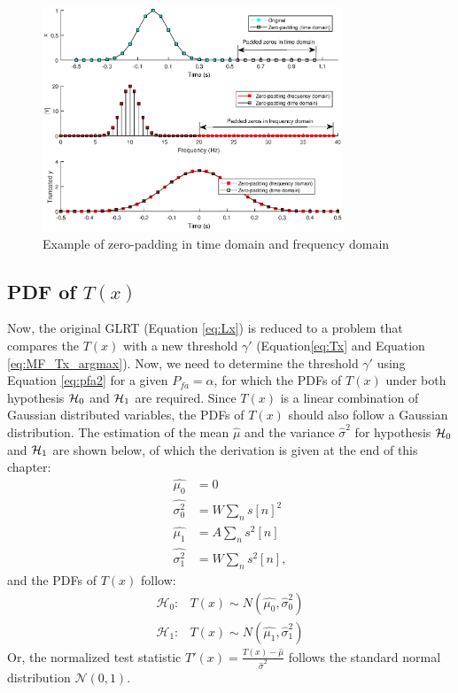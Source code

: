 \begin{figure}[t!p]
\centering
\includegraphics[width=0.8\textwidth]{figures/chapter_ADC_MF/signal_pad_nopad.eps}
\caption{Example of zero-padding in time domain and frequency domain}
\label{fig:ADC_NP_zeropad}
\end{figure}
\subsection{PDF of $T(x)$}
Now, the original GLRT (Equation \eqref{eq:Lx}) is reduced to a problem that compares the $T(x)$ with a new threshold $\gamma'$ (Equation\eqref{eq:Tx} and Equation \eqref{eq:MF_Tx_argmax}). Now, we need to determine the threshold $\gamma'$ using Equation \eqref{eq:pfa2} for a given $P_{fa} = \alpha$, for which the PDFs of $T(x)$ under both hypothesis $\operatorname*{\mathcal{H}_0}$ and $\operatorname*{\mathcal{H}_1}$ are required. Since $T(x)$ is a linear combination of Gaussian distributed variables, the PDFs of $T(x)$ should also follow a Gaussian distribution. The estimation of the mean $\hat{\mu}$ and the variance $\hat{\sigma}^2$ for hypothesis $\operatorname*{\mathcal{H}_0}$ and $\operatorname*{\mathcal{H}_1}$ are shown below, of which the derivation is given at the end of this chapter:
\begin{align} \label{eq:pdfTx}
\hat{\mu_0}&=0\\
\hat{\sigma_0^2}&=W\sum_ns[n]^2\\
\hat{\mu_1}&=A\sum_ns^2[n]\\
\hat{\sigma_1^2}&=W\sum_ns^2[n],
\end{align}
and the PDFs of $T(x)$ follow:
\begin{align}
\mathcal{H}_0: & T(x)\sim N(\hat{\mu_0}, \hat{\sigma}_0^2)\\
\mathcal{H}_1: & T(x)\sim N(\hat{\mu_1}, \hat{\sigma}_1^2)
\end{align}
Or, the normalized test statistic $T'(x) = \frac{T(x)-\hat{\mu}}{\hat{\sigma}^2}$ follows the standard normal distribution $\mathcal{N}(0,1)$.
